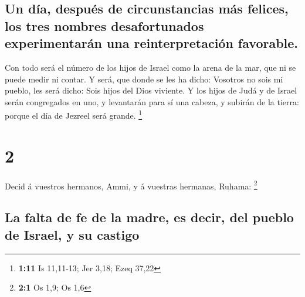 \hypertarget{un-duxeda-despuuxe9s-de-circunstancias-muxe1s-felices-los-tres-nombres-desafortunados-experimentaruxe1n-una-reinterpretaciuxf3n-favorable.}{%
\subsection{Un día, después de circunstancias más felices, los tres
nombres desafortunados experimentarán una reinterpretación
favorable.}\label{un-duxeda-despuuxe9s-de-circunstancias-muxe1s-felices-los-tres-nombres-desafortunados-experimentaruxe1n-una-reinterpretaciuxf3n-favorable.}}

 Con todo será el número de los hijos de Israel como la
arena de la mar, que ni se puede medir ni contar. Y será, que donde se
les ha dicho: Vosotros no sois mi pueblo, les será dicho: Sois hijos del
Dios viviente.  Y los hijos de Judá y de Israel serán
congregados en uno, y levantarán para sí una cabeza, y subirán de la
tierra: porque el día de Jezreel será grande. \footnote{\textbf{1:11} Is
  11,11-13; Jer 3,18; Ezeq 37,22}

\hypertarget{section-1}{%
\section{2}\label{section-1}}

 Decid á vuestros hermanos, Ammi, y á vuestras hermanas,
Ruhama: \footnote{\textbf{2:1} Os 1,9; Os 1,6}

\hypertarget{la-falta-de-fe-de-la-madre-es-decir-del-pueblo-de-israel-y-su-castigo}{%
\subsection{La falta de fe de la madre, es decir, del pueblo de Israel,
y su
castigo}\label{la-falta-de-fe-de-la-madre-es-decir-del-pueblo-de-israel-y-su-castigo}}


